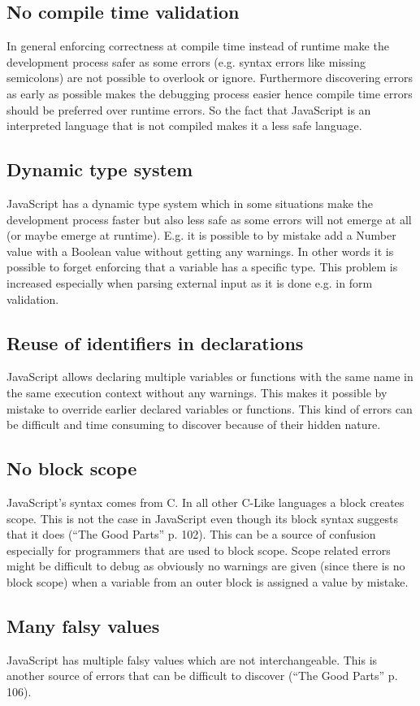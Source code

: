 		\subsection{No compile time validation}
			In general enforcing correctness at compile time instead of runtime make the development process safer as some errors (e.g. syntax errors like missing semicolons) are not possible to overlook or ignore. Furthermore discovering errors as early as possible makes the debugging process easier hence compile time errors should be preferred over runtime errors. So the fact that JavaScript is an interpreted language that is not compiled makes it a less safe language.

		\subsection{Dynamic type system}
			JavaScript has a dynamic type system which in some situations make the development process faster but also less safe as some errors will not emerge at all (or maybe emerge at runtime). E.g. it is possible to by mistake add a Number value with a Boolean value without getting any warnings. In other words it is possible to forget enforcing that a variable has a specific type. This problem is increased especially when parsing external input as it is done e.g. in form validation.
		
		\subsection{Reuse of identifiers in declarations}
			JavaScript allows declaring multiple variables or functions with the same name in the same execution context without any warnings. This makes it possible by mistake to override earlier declared variables or functions. This kind of errors can be difficult and time consuming to discover because of their hidden nature.

		\subsection{No block scope}
			JavaScript’s syntax comes from C. In all other C-Like languages a block creates scope. This is not the case in JavaScript even though its block syntax suggests that it does (“The Good Parts” p. 102). This can be a source of confusion especially for programmers that are used to block scope. Scope related errors might be difficult to debug as obviously no warnings are given (since there is no block scope) when a variable from an outer block is assigned a value by mistake.

		\subsection{Many falsy values}
			JavaScript has multiple falsy values which are not interchangeable. This is another source of errors that can be difficult to discover (“The Good Parts” p. 106).

